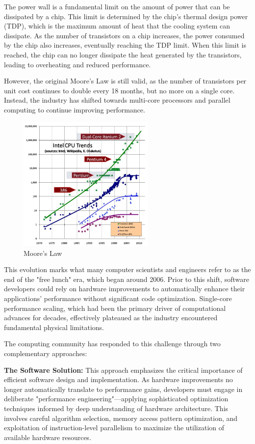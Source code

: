 The power wall is a fundamental limit on the amount of power that can be dissipated by a chip. This limit is determined by the chip's thermal design power (TDP), which is the maximum amount of heat that the cooling system can dissipate. As the number of transistors on a chip increases, the power consumed by the chip also increases, eventually reaching the TDP limit. When this limit is reached, the chip can no longer dissipate the heat generated by the transistors, leading to overheating and reduced performance.

However, the original Moore's Law is still valid, as the number of transistors per unit cost continues to double every 18 months, but no more on a single core. Instead, the industry has shifted towards multi-core processors and parallel computing to continue improving performance.

\begin{figure}[H]
    \centering
    \includegraphics[width=0.6\textwidth]{assets/moore.jpg}
    \caption{Moore's Law}
    \label{fig:moore}
\end{figure}

This evolution marks what many computer scientists and engineers refer to as the end of the "free lunch" era, which began around 2006. Prior to this shift, software developers could rely on hardware improvements to automatically enhance their applications' performance without significant code optimization. Single-core performance scaling, which had been the primary driver of computational advances for decades, effectively plateaued as the industry encountered fundamental physical limitations.

The computing community has responded to this challenge through two complementary approaches:

\textbf{The Software Solution:} This approach emphasizes the critical importance of efficient software design and implementation. As hardware improvements no longer automatically translate to performance gains, developers must engage in deliberate "performance engineering"—applying sophisticated optimization techniques informed by deep understanding of hardware architecture. This involves careful algorithm selection, memory access pattern optimization, and exploitation of instruction-level parallelism to maximize the utilization of available hardware resources.

